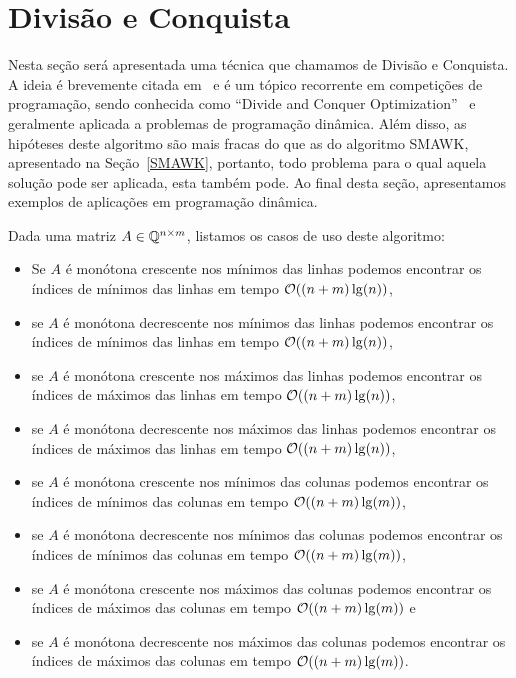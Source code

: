 \section{Divisão e Conquista}
\label{DivisaoEConquista}


Nesta seção será apresentada uma técnica que chamamos de Divisão e Conquista. A ideia é brevemente citada em~\cite{needed} e é um tópico recorrente em competições de programação, sendo conhecida como ``Divide and Conquer Optimization''~\cite{needed} e geralmente aplicada a problemas de programação dinâmica. Além disso, as hipóteses deste algoritmo são mais fracas do que as do algoritmo SMAWK, apresentado na Seção~\ref{SMAWK}, portanto, todo problema para o qual aquela solução pode ser aplicada, esta também pode. Ao final desta seção, apresentamos exemplos de aplicações em programação dinâmica.  

Dada uma matriz $A \in \mathbb{Q}^{n \times m}$, listamos os casos de uso deste algoritmo:
\begin{itemize}
    \item Se $A$ é monótona crescente nos mínimos das linhas podemos encontrar os índices de mínimos das linhas em tempo $\mathcal{O}((n+m)\lg(n))$, 
    \item se $A$ é monótona decrescente nos mínimos das linhas podemos encontrar os índices de mínimos das linhas em tempo $\mathcal{O}((n+m)\lg(n))$, 
    \item se $A$ é monótona crescente nos máximos das linhas podemos encontrar os índices de máximos das linhas em tempo $\mathcal{O}((n+m)\lg(n))$, 
    \item se $A$ é monótona decrescente nos máximos das linhas podemos encontrar os índices de máximos das linhas em tempo $\mathcal{O}((n+m)\lg(n))$, 
    \item se $A$ é monótona crescente nos mínimos das colunas podemos encontrar os índices de mínimos das colunas em tempo $\mathcal{O}((n+m)\lg(m))$, 
    \item se $A$ é monótona decrescente nos mínimos das colunas podemos encontrar os índices de mínimos das colunas em tempo $\mathcal{O}((n+m)\lg(m))$, 
    \item se $A$ é monótona crescente nos máximos das colunas podemos encontrar os índices de máximos das colunas em tempo $\mathcal{O}((n+m)\lg(m))$ e 
    \item se $A$ é monótona decrescente nos máximos das colunas podemos encontrar os índices de máximos das colunas em tempo $\mathcal{O}((n+m)\lg(m))$.
\end{itemize}

